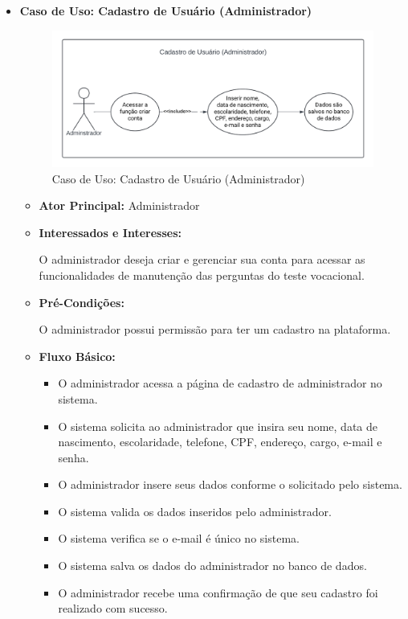 \begin{itemize}
    \item \textbf{Caso de Uso: Cadastro de Usuário (Administrador)}
    
        \begin{figure}[ht]
            \centering
            \includegraphics[scale=0.8]{caso-de-uso_cadastro-de-usuario-administrador.png}
            \caption{Caso de Uso: Cadastro de Usuário (Administrador)}
            \label{fig:enter-label}
        \end{figure}
        
        \begin{itemize}
            \item \textbf{Ator Principal:} Administrador
            \item \textbf{Interessados e Interesses:}
            
            O administrador deseja criar e gerenciar sua conta para acessar as funcionalidades de manutenção das perguntas do teste vocacional.
            \item \textbf{Pré-Condições:}
            
            O administrador possui permissão para ter um cadastro na plataforma.
             \item \textbf{Fluxo Básico:}

             \begin{itemize}
                 \item O administrador acessa a página de cadastro de administrador no sistema.
                 \item O sistema solicita ao administrador que insira seu nome, data de nascimento, escolaridade, telefone, CPF, endereço, cargo, e-mail e senha.
                 \item O administrador insere seus dados conforme o solicitado pelo sistema.
                 \item O sistema valida os dados inseridos pelo administrador.
                 \item O sistema verifica se o e-mail é único no sistema.
                 \item O sistema salva os dados do administrador no banco de dados.
                 \item O administrador recebe uma confirmação de que seu cadastro foi realizado com sucesso.
             \end{itemize}



\end{itemize}
\end{itemize}
